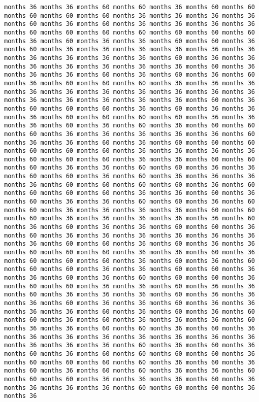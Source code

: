 \documentclass[11pt]{article}
\begin{document}
\begin{Verbatim}[commandchars=\\\{\}, frame=single, framerule=2mm, rulecolor=\color{outerrorbackground}]
months 36 months 36 months 60 months 60 months 36 months 60 months 60 months 60 months 60 months 60 months 36 months 36 months 36 months 36 months 60 months 36 months 60 months 36 months 36 months 36 months 36 months 60 months 60 months 60 months 60 months 60 months 60 months 60 months 36 months 60 months 36 months 36 months 60 months 60 months 36 months 60 months 36 months 36 months 36 months 36 months 36 months 36 months 36 months 36 months 36 months 36 months 60 months 36 months 36 months 36 months 36 months 36 months 36 months 36 months 60 months 36 months 36 months 36 months 60 months 36 months 60 months 36 months 60 months 36 months 60 months 60 months 60 months 36 months 36 months 36 months 36 months 36 months 36 months 36 months 36 months 36 months 36 months 36 months 36 months 36 months 36 months 36 months 60 months 36 months 60 months 60 months 60 months 36 months 60 months 36 months 36 months 36 months 60 months 60 months 60 months 60 months 36 months 36 months 36 months 60 months 36 months 60 months 36 months 60 months 60 months 60 months 36 months 36 months 36 months 36 months 36 months 60 months 36 months 36 months 60 months 36 months 60 months 60 months 60 months 60 months 60 months 60 months 36 months 36 months 36 months 36 months 60 months 60 months 60 months 36 months 36 months 60 months 60 months 60 months 36 months 36 months 60 months 60 months 36 months 36 months 60 months 60 months 36 months 60 months 36 months 36 months 36 months 36 months 60 months 60 months 60 months 60 months 36 months 60 months 60 months 60 months 60 months 36 months 36 months 60 months 36 months 60 months 36 months 36 months 60 months 60 months 36 months 60 months 60 months 36 months 36 months 36 months 36 months 60 months 60 months 60 months 36 months 36 months 36 months 36 months 36 months 60 months 36 months 60 months 36 months 36 months 60 months 60 months 36 months 60 months 36 months 36 months 36 months 36 months 36 months 36 months 36 months 60 months 60 months 36 months 60 months 36 months 36 months 60 months 60 months 60 months 36 months 36 months 60 months 36 months 60 months 60 months 60 months 36 months 60 months 36 months 60 months 60 months 60 months 36 months 36 months 60 months 60 months 36 months 36 months 60 months 36 months 60 months 60 months 60 months 36 months 60 months 60 months 36 months 36 months 60 months 36 months 36 months 60 months 36 months 36 months 36 months 60 months 36 months 36 months 36 months 60 months 36 months 36 months 60 months 36 months 36 months 36 months 36 months 60 months 36 months 60 months 36 months 60 months 60 months 36 months 60 months 36 months 36 months 36 months 60 months 36 months 36 months 60 months 60 months 36 months 60 months 36 months 36 months 36 months 36 months 36 months 36 months 36 months 36 months 36 months 36 months 36 months 60 months 36 months 60 months 36 months 60 months 36 months 60 months 60 months 60 months 60 months 36 months 60 months 60 months 60 months 60 months 36 months 60 months 36 months 60 months 36 months 60 months 60 months 36 months 36 months 60 months 60 months 60 months 36 months 36 months 36 months 60 months 36 months 36 months 36 months 36 months 60 months 60 months 60 months 36 months 36 
\end{Verbatim}
\end{document}
